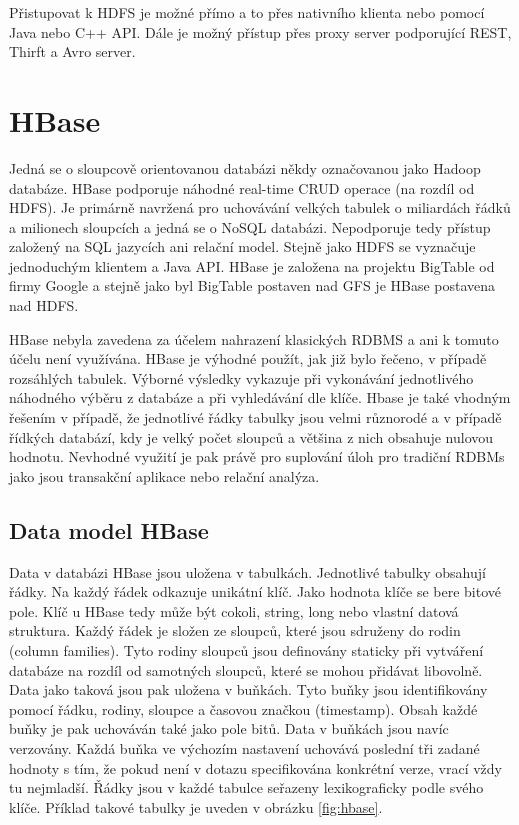 \documentclass[thesis=M,czech]{FITthesis}[2012/06/26]
\begin{document}
Přistupovat k HDFS je možné přímo a to přes nativního klienta nebo pomocí Java nebo C++ API. Dále je možný přístup přes proxy server podporující REST, Thirft a Avro server.

\section{HBase}
Jedná se o sloupcově orientovanou databázi někdy označovanou jako Hadoop databáze. HBase podporuje náhodné real-time CRUD operace (na rozdíl od HDFS). Je primárně navržená pro uchovávání velkých tabulek o miliardách řádků a milionech sloupcích a jedná se o NoSQL databázi. Nepodporuje tedy přístup založený na SQL jazycích ani relační model. Stejně jako HDFS se vyznačuje jednoduchým klientem a Java API. HBase je založena na projektu BigTable od firmy Google\cite{BigTable} a stejně jako byl BigTable postaven nad GFS je HBase postavena nad HDFS.\cite{HbaseDG}

HBase nebyla zavedena za účelem nahrazení klasických RDBMS a ani k tomuto účelu není využívána. HBase je výhodné použít, jak již bylo řečeno, v případě rozsáhlých tabulek. Výborné výsledky vykazuje při vykonávání jednotlivého náhodného výběru z databáze a při vyhledávání dle klíče. Hbase je také vhodným řešením v případě, že jednotlivé řádky tabulky jsou velmi různorodé a v případě řídkých databází, kdy je velký počet sloupců a většina z nich obsahuje nulovou hodnotu. Nevhodné využití je pak právě pro suplování úloh pro tradiční RDBMs jako jsou transakční aplikace nebo relační analýza.\cite{HBaseWEB}

\subsection{Data model HBase}


Data v databázi HBase jsou uložena v tabulkách. Jednotlivé tabulky obsahují řádky. Na každý řádek odkazuje unikátní klíč. Jako hodnota klíče se bere bitové pole. Klíč u HBase tedy může být cokoli, string, long nebo vlastní datová struktura. Každý řádek je složen ze sloupců, které jsou sdruženy do rodin (column families). Tyto rodiny sloupců jsou definovány staticky při vytváření databáze na rozdíl od samotných sloupců, které se mohou přidávat libovolně. Data jako taková jsou pak uložena v buňkách. Tyto buňky jsou identifikovány pomocí řádku, rodiny, sloupce a časovou značkou (timestamp). Obsah každé buňky je pak uchováván také jako pole bitů. Data v buňkách jsou navíc verzovány. Každá buňka ve výchozím nastavení uchovává poslední tři zadané hodnoty s tím, že pokud není v dotazu specifikována konkrétní verze, vrací vždy tu nejmladší. Řádky jsou v každé tabulce seřazeny lexikograficky podle svého klíče. Příklad takové tabulky je uveden v obrázku \ref{fig:hbase}.
\end{document}
